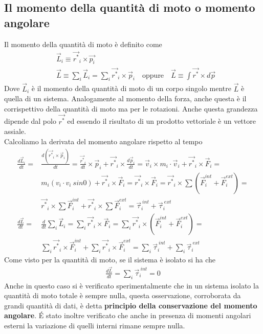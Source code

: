 \subsection{Il momento della quantità di moto o momento angolare}
Il momento della quantità di moto è definito come
\begin{align*}
	&\vec{L}_i \equiv \vec{r^*}_i \times \vec{p_i}\\
	&\vec{L} \equiv \sum_{i}\vec{L}_i = \sum_{i}\vec{r^*}_i \times \vec{p}_i \quad \text{oppure} \quad \vec{L} \equiv \int \vec{r^*} \times d\vec{p}
\end{align*}
Dove $\vec{L}_i$ è il momento della quantità di moto di un corpo singolo mentre $\vec{L}$ è quella di un sistema. Analogamente al momento della forza, anche questa è il corrispettivo della quantità di moto ma per le rotazioni. Anche questa grandezza dipende dal polo $\vec{r^*}$ ed essendo il risultato di un prodotto vettoriale è un vettore assiale.\\
Calcoliamo la derivata del momento angolare rispetto al tempo
\begin{align*}
	\frac{d\vec{L}_i}{dt} =& \frac{d(\vec{r^*}_i \times \vec{p}_i)}{dt}=  \frac{\vec{r^*}_i}{dt} \times \vec{p}_i + \vec{r^*}_i  \times \frac{d\vec{p}_i}{dt} = \vec{v}_i \times m_i\cdot\vec{v}_i + \vec{r^*}_i \times \vec{F}_i =\\
	& m_i(v_i\cdot v_i\ sin0) + \vec{r^*}_i \times \vec{F}_i= \vec{r^*}_i \times \vec{F}_i = \vec{r^*}_i \times \sum (\vec{F}^{int}_i +\vec{F}^{ext}_i)=\\ &\vec{r^*}_i \times \sum \vec{F}^{int}_i+\vec{r^*}_i \times \sum \vec{F}^{ext}_i = \vec{\tau}_i^{\ int}+\vec{\tau}_i^{\ ext} \\
	\frac{d\vec{L}}{dt} = & \frac{d }{dt}\sum_{i}\vec{L}_i =\sum_{i} \vec{r^*}_i \times \vec{F}_i=\sum_{i} \vec{r^*}_i \times (\vec{F}^{int}_i+\vec{F}^{ext}_i)=\\ 
	&\sum_{i} \vec{r^*}_i \times \vec{F}^{int}_i+\sum_{i} \vec{r^*}_i \times \vec{F}^{ext}_i=\sum_{i}\vec{\tau}_i^{\ int} + \sum_{i}\vec{\tau}_i^{\ ext}
\end{align*}
Come visto per la quantità di moto, se il sistema è isolato si ha che 
\begin{align*}
		\frac{d\vec{L}}{dt} =\sum_{i}\vec{\tau}_i^{\ int}=0
\end{align*}
Anche in questo caso si è verificato sperimentalmente che in un sistema isolato la quantità di moto totale è sempre nulla, questa osservazione, corroborata da grandi quantità di dati, è detta \textbf{principio della conservazione del momento angolare}. \'{E} stato inoltre verificato che anche in presenza di momenti angolari esterni la variazione di quelli interni rimane sempre nulla.\\
